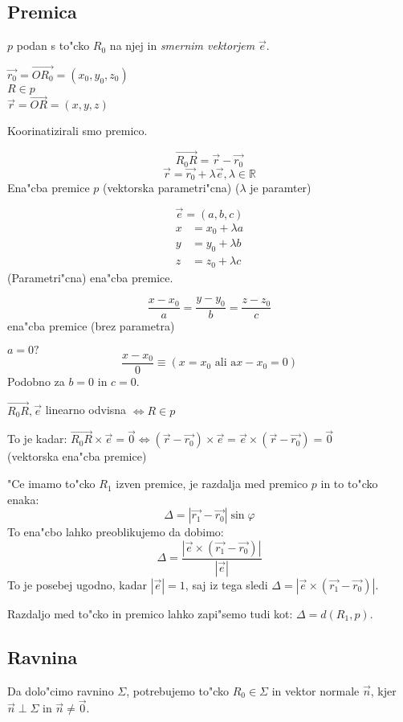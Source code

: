 \subsection{Premica}
$p$ podan s to"cko $R_0$ na njej in \emph{smernim vektorjem} $\vec{e}$.

$\vec{r_0} = \vec{OR_0} = (x_0, y_0, z_0)$\\
$R \in p$\\
$\vec{r} = \vec{OR} = (x, y, z)$

Koorinatizirali smo premico.

\[\vec{R_0R} = \vec{r} - \vec{r_0}\]
\[\vec{r} = \vec{r_0} + \lambda \vec{e}, \lambda \in \mathbb{R}\]
Ena"cba premice $p$ (vektorska parametri"cna) ($\lambda$ je paramter)

\[\vec{e} = (a, b, c)\]
\begin{align*}
	x &= x_0 + \lambda a\\
	y &= y_0 + \lambda b\\
	z &= z_0 + \lambda c
\end{align*}
(Parametri"cna) ena"cba premice.

\[
\frac{x - x_0}{a} = \frac{y - y_0}{b} = \frac{z - z_0}{c}
\]
ena"cba premice (brez parametra)

$a = 0 ?$
\[\frac{x - x_0}{0} \equiv (x = x_0 \text{ ali a} x - x_0 = 0)\]
Podobno za $b = 0$ in $c = 0$.

$\vec{R_0R}, \vec{e}$ linearno odvisna $\Leftrightarrow R \in p$

To je kadar: $\vec{R_0R} \times \vec{e} = \vec{0} \Leftrightarrow (\vec{r} - \vec{r_0}) \times \vec{e} = \vec{e} \times (\vec{r} - \vec{r_0}) = \vec{0}$\\
(vektorska ena"cba premice)

"Ce imamo to"cko $R_1$ izven premice, je razdalja med premico $p$ in to to"cko enaka:
\[
\Delta = |\vec{r_1} - \vec{r_0}| \sin \varphi
\]
To ena"cbo lahko preoblikujemo da dobimo:
\[
\Delta = \frac{|\vec{e} \times (\vec{r_1} - \vec{r_0})|}{|\vec{e}|}
\]
To je posebej ugodno, kadar $|\vec{e}| = 1$, saj iz tega sledi $\Delta = |\vec{e} \times (\vec{r_1} - \vec{r_0})|$.

Razdaljo med to"cko in premico lahko zapi"semo tudi kot: $\Delta = d(R_1, p)$.

\subsection{Ravnina}
Da dolo"cimo ravnino $\Sigma$, potrebujemo to"cko $R_0 \in \Sigma$ in vektor normale $\vec{n}$, kjer $\vec{n} \perp \Sigma$ in $\vec{n} \neq \vec{0}$.

